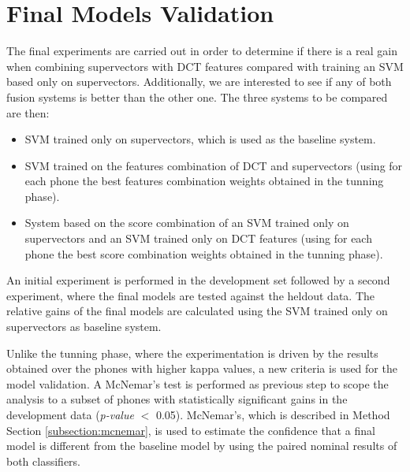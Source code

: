 \section{Final Models Validation} \label{subsection:modelValidation}

The final experiments are carried out in order
to determine if there is a real gain when combining
supervectors with DCT features compared with training an SVM based only on supervectors.
Additionally, we are interested to see if any of both fusion systems is better
than the other one. The three systems to be compared are then:

\begin{itemize}
	\item SVM trained only on supervectors, which is used as the baseline system.
	\item SVM trained on the features combination of DCT and supervectors (using for each phone the best features combination weights obtained in the tunning phase).
	\item System based on the score combination of an SVM trained
	only on supervectors and an SVM trained
	only on DCT features (using for each phone the best score combination weights obtained in the tunning phase).
\end{itemize}

An initial experiment is performed in the development set
followed by a second experiment, where
the final models are tested against the heldout data.
The relative gains of the final models
are calculated using the SVM trained only on supervectors as baseline system.

Unlike the tunning phase, where the experimentation is driven by the results obtained
over the phones with higher kappa values, a new criteria is used for the model validation.
A McNemar's test is performed as previous step to scope the analysis
to a subset of phones with statistically significant gains in the development
data (\textit{p-value} $<$ 0.05).
McNemar's, which is described in Method Section \ref{subsection:mcnemar},
is used to estimate the confidence that a final model is different from
the baseline model by using the paired nominal results of both classifiers.


